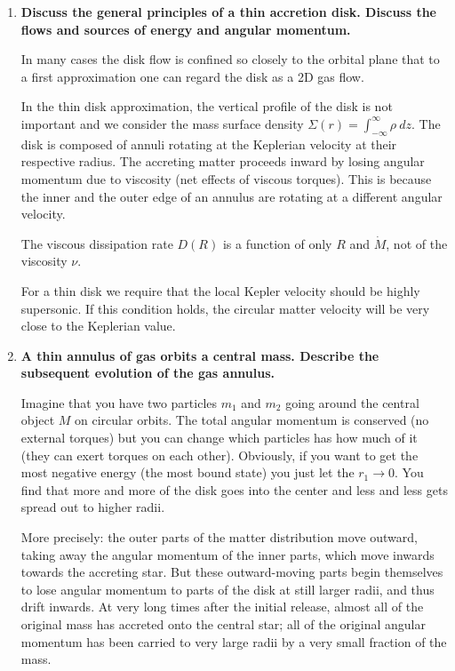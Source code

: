 \documentclass[a4paper]{article}
\begin{document}
\begin{enumerate}
\item \textbf{Discuss the general principles of a thin accretion disk. Discuss the flows and sources of energy and angular momentum.}

In many cases the disk flow is confined so closely to the orbital plane that to a first approximation one can regard the disk as a 2D gas flow. 

In the thin disk approximation, the vertical profile of the disk is not important and we consider the mass surface density $\Sigma(r) = \int_{-\infty}^{\infty} \rho \  dz $. The disk is composed of annuli rotating at the Keplerian velocity at their respective radius. The accreting matter proceeds inward by losing angular momentum due to viscosity (net effects of viscous torques). This is because the inner and the outer edge of an annulus are rotating at a different angular velocity. 

The viscous dissipation rate $D(R)$ is a function of only $R$ and $\dot{M}$, not of the viscosity $\nu$. 

For a thin disk we require that the local Kepler velocity should be highly supersonic. If this condition holds, the circular matter velocity will be very close to the Keplerian value. 

\item \textbf{A thin annulus of gas orbits a central mass. Describe the subsequent evolution of the gas annulus.}

Imagine that you have two particles $m_1$ and $m_2$ going around the central object $M$ on circular orbits. The total angular momentum is conserved (no external torques) but you can change which particles has how much of it (they can exert torques on each other). Obviously, if you want to get the most negative energy (the most bound state) you just let the $r_1 \rightarrow 0$. You find that more and more of the disk goes into the center and less and less gets spread out to higher radii.  

More precisely: the outer parts of the matter distribution move outward, taking away the angular momentum of the inner parts, which move inwards towards the accreting star. But these outward-moving parts begin themselves to lose angular momentum to parts of the disk at still larger radii, and thus drift inwards. At very long times after the initial release, almost all of the original mass has accreted onto the central star; all of the original angular momentum has been carried to very large radii by a very small fraction of the mass. 


\end{enumerate}
\end{document}
